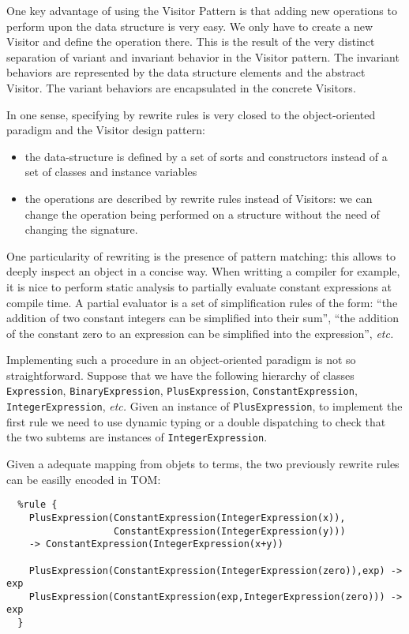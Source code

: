 \documentclass[a4paper]{article}
\newcommand{\TOM}{\textsf{TOM}}
\begin{document}
One key advantage of using the Visitor Pattern is that adding new
operations to perform upon the data structure is very easy. 
We only have to create a new Visitor and define the operation there.
This is the result of the very distinct separation of variant and
invariant behavior in the Visitor pattern.   
The invariant behaviors are represented by the data structure elements
and the abstract Visitor. The variant behaviors are encapsulated in
the concrete Visitors. 

In one sense, specifying by rewrite rules is very closed to the
object-oriented paradigm and the Visitor design pattern:  
\begin{itemize}
\item the data-structure is defined by a set of sorts and constructors 
  instead of a set of classes and instance variables
\item the operations are described by rewrite rules instead of
  Visitors: we can change the operation being performed on a structure
  without the need of changing the signature.
\end{itemize}

One particularity of rewriting is the presence of pattern matching:
this allows to deeply inspect an object in a concise way.
When writting a compiler for example, it is nice to perform static
analysis to partially evaluate constant expressions at compile time.
A partial evaluator is a set of simplification rules of the form:
``the addition of two constant integers can be simplified into their
sum'', ``the addition of the constant zero to an expression can be
simplified into the expression'', \textit{etc.} 

Implementing such a procedure in an object-oriented paradigm is not so
straightforward. Suppose that we have the following hierarchy of classes
\texttt{Expression}, \texttt{BinaryExpression},
\texttt{PlusExpression}, \texttt{ConstantExpression},
\texttt{IntegerExpression}, \textit{etc.} 
Given an instance of \texttt{PlusExpression}, to implement the first
rule we need to use dynamic typing or a double dispatching to check
that the two subtems are instances of \texttt{IntegerExpression}. 

Given a adequate mapping from objets to terms, the two previously
rewrite rules can be easilly encoded in \TOM:
\begin{verbatim}
  %rule {
    PlusExpression(ConstantExpression(IntegerExpression(x)),
                   ConstantExpression(IntegerExpression(y)))
    -> ConstantExpression(IntegerExpression(x+y))

    PlusExpression(ConstantExpression(IntegerExpression(zero)),exp) -> exp
    PlusExpression(ConstantExpression(exp,IntegerExpression(zero))) -> exp
  }
\end{verbatim}
\end{document}
